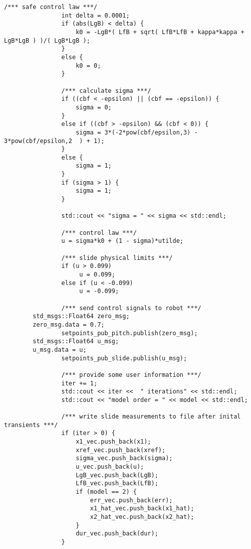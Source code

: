\begin{lstlisting}[language=gedit]
                /*** safe control law ***/
                int delta = 0.0001;
                if (abs(LgB) < delta) {
                    k0 = -LgB*( LfB + sqrt( LfB*LfB + kappa*kappa + LgB*LgB ) )/( LgB*LgB );
                }
                else {
                    k0 = 0;
                }          
 
                /*** calculate sigma ***/
                if ((cbf < -epsilon) || (cbf == -epsilon)) {
                    sigma = 0;
                }
                else if ((cbf > -epsilon) && (cbf < 0)) {
                    sigma = 3*(-2*pow(cbf/epsilon,3) - 3*pow(cbf/epsilon,2	) + 1);
                }
                else {
                    sigma = 1;
                }
                if (sigma > 1) {
                    sigma = 1;
                }
               
                std::cout << "sigma = " << sigma << std::endl;

                /*** control law ***/
                u = sigma*k0 + (1 - sigma)*utilde;

                /*** slide physical limits ***/
                if (u > 0.099)
                     u = 0.099;
                else if (u < -0.099)
                     u = -0.099;
                
                /*** send control signals to robot ***/
		std_msgs::Float64 zero_msg;
		zero_msg.data = 0.7;
                setpoints_pub_pitch.publish(zero_msg);
		std_msgs::Float64 u_msg;
		u_msg.data = u;
                setpoints_pub_slide.publish(u_msg);

                /*** provide some user information ***/
                iter += 1;
                std::cout << iter <<  " iterations" << std::endl;
                std::cout << "model order = " << model << std::endl;

                /*** write slide measurements to file after inital transients ***/
                if (iter > 0) {
                    x1_vec.push_back(x1);
                    xref_vec.push_back(xref);
                    sigma_vec.push_back(sigma);
                    u_vec.push_back(u);
                    LgB_vec.push_back(LgB);
                    LfB_vec.push_back(LfB);
                    if (model == 2) {
                        err_vec.push_back(err);
                        x1_hat_vec.push_back(x1_hat);
                        x2_hat_vec.push_back(x2_hat);
                    }
                    dur_vec.push_back(dur);
                }


\end{lstlisting}
